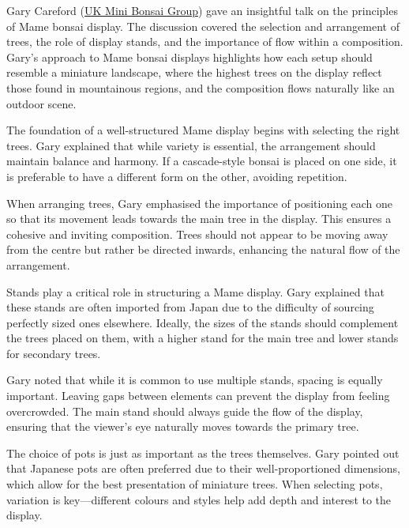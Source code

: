 \label{2025-04-display}
\noindent
Gary Careford (\href{https://ukminibonsaigroup.weebly.com}{UK Mini Bonsai Group}) gave an insightful talk on the principles of Mame bonsai display.
The discussion covered the selection and arrangement of trees, the role of display stands, and the importance of flow within a composition.
Gary's approach to Mame bonsai displays highlights how each setup should resemble a miniature landscape, where the highest trees on the display reflect those found in mountainous regions, and the composition flows naturally like an outdoor scene.

\medskip

\noindent
The foundation of a well\--structured Mame display begins with selecting the right trees.
Gary explained that while variety is essential, the arrangement should maintain balance and harmony.
If a cascade\--style bonsai is placed on one side, it is preferable to have a different form on the other, avoiding repetition.

When arranging trees, Gary emphasised the importance of positioning each one so that its movement leads towards the main tree in the display.
This ensures a cohesive and inviting composition.
Trees should not appear to be moving away from the centre but rather be directed inwards, enhancing the natural flow of the arrangement.

\medskip

\noindent
Stands play a critical role in structuring a Mame display.
Gary explained that these stands are often imported from Japan due to the difficulty of sourcing perfectly sized ones elsewhere.
Ideally, the sizes of the stands should complement the trees placed on them, with a higher stand for the main tree and lower stands for secondary trees.

Gary noted that while it is common to use multiple stands, spacing is equally important.
Leaving gaps between elements can prevent the display from feeling overcrowded.
The main stand should always guide the flow of the display, ensuring that the viewer's eye naturally moves towards the primary tree.

\medskip

\noindent
The choice of pots is just as important as the trees themselves.
Gary pointed out that Japanese pots are often preferred due to their well\--proportioned dimensions, which allow for the best presentation of miniature trees.
When selecting pots, variation is key---different colours and styles help add depth and interest to the display.

